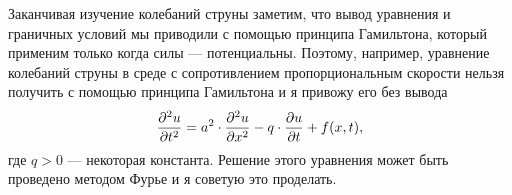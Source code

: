 Заканчивая изучение колебаний струны заметим, что вывод уравнения и граничных условий мы приводили с помощью принципа Гамильтона, который применим только когда силы --- потенциальны. Поэтому, например, уравнение колебаний струны в среде с сопротивлением пропорциональным скорости нельзя получить с помощью принципа Гамильтона и я привожу его без вывода
\begin{equation*}
	\hfill\pdder{u}{t}=a^2\cdot\pdder{u}{x}-q\cdot\pder{u}{t}+f(x,t),\hfill
\end{equation*} 
где $q>0$ --- некоторая константа. Решение этого уравнения может быть проведено методом Фурье и я советую это проделать.